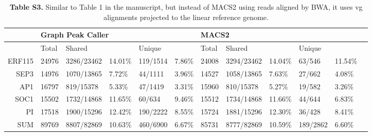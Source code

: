 \documentclass[a4paper,8pt]{article}
\title{}
\author{}
\begin{document}
\begin{table}[]
\begin{adjustwidth}{-1.05in}{0in} %
\centering
\caption*{\textbf{Table S3.} Similar to Table 1 in the manuscript, but instead of MACS2 using reads aligned by BWA, it uses vg alignments projected to the linear reference genome.}

\label{table1}
\begin{tabular}{llllllllllll}
\toprule
 & \multicolumn{5}{l|}{Graph Peak Caller}                        & \multicolumn{5}{l}{MACS2}                       \\ \midrule
 &  \multicolumn{1}{|l}{Total} & \multicolumn{2}{l}{Shared} & \multicolumn{2}{l|}{Unique} & Total & \multicolumn{2}{l}{Shared} & \multicolumn{2}{l}{Unique} \\ \midrule
\multicolumn{1}{r|}{ERF115} & 24976 & 3286/23462 & 14.01\% & 119/1514 & 7.86\% & \multicolumn{1}{|l}{24008} & 3294/23462 & 14.04\% & 63/546 & 11.54\% & \\ 
\multicolumn{1}{r|}{SEP3} & 14976 & 1070/13865 & 7.72\% & 44/1111 & 3.96\% & \multicolumn{1}{|l}{14527} & 1058/13865 & 7.63\% & 27/662 & 4.08\% & \\ 
\multicolumn{1}{r|}{AP1} & 16797 & 819/15378 & 5.33\% & 47/1419 & 3.31\% & \multicolumn{1}{|l}{15960} & 810/15378 & 5.27\% & 19/582 & 3.26\% & \\ 
\multicolumn{1}{r|}{SOC1} & 15502 & 1732/14868 & 11.65\% & 60/634 & 9.46\% & \multicolumn{1}{|l}{15512} & 1734/14868 & 11.66\% & 44/644 & 6.83\% & \\ 
\multicolumn{1}{r|}{PI} & 17518 & 1900/15296 & 12.42\% & 190/2222 & 8.55\% & \multicolumn{1}{|l}{15724} & 1881/15296 & 12.30\% & 36/428 & 8.41\% & \\ 
\midrule\multicolumn{1}{r|}{SUM} & 89769 & 8807/82869 & 10.63\% & 460/6900 & 6.67\% & \multicolumn{1}{|l}{85731} & 8777/82869 & 10.59\% & 189/2862 & 6.60\% & \\ 
\bottomrule
\end{tabular}
\end{adjustwidth}
\end{table}
\end{document}

